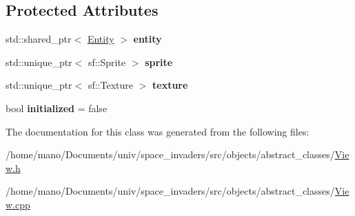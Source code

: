 \subsection*{Protected Attributes}
\begin{DoxyCompactItemize}
\item 
\mbox{\label{classobjects_1_1View_aacd0b5eb20efc07425ba1fdde39aaebe}}
std\+::shared\+\_\+ptr$<$ \hyperlink{classobjects_1_1Entity}{Entity} $>$ {\bfseries entity}
\item 
\mbox{\label{classobjects_1_1View_a8d21dfa5a6479b509e0c7806d2637d2a}}
std\+::unique\+\_\+ptr$<$ sf\+::\+Sprite $>$ {\bfseries sprite}
\item 
\mbox{\label{classobjects_1_1View_a9858db6cad1df3649e96a3aaa9edea7e}}
std\+::unique\+\_\+ptr$<$ sf\+::\+Texture $>$ {\bfseries texture}
\item 
\mbox{\label{classobjects_1_1View_ae2ebde4944e5808450d560508bf722a6}}
bool {\bfseries initialized} = false
\end{DoxyCompactItemize}


The documentation for this class was generated from the following files\+:\begin{DoxyCompactItemize}
\item 
/home/mano/\+Documents/univ/space\+\_\+invaders/src/objects/abstract\+\_\+classes/\hyperlink{View_8h}{View.\+h}\item
/home/mano/\+Documents/univ/space\+\_\+invaders/src/objects/abstract\+\_\+classes/\hyperlink{View_8cpp}{View.\+cpp}\end{DoxyCompactItemize}

